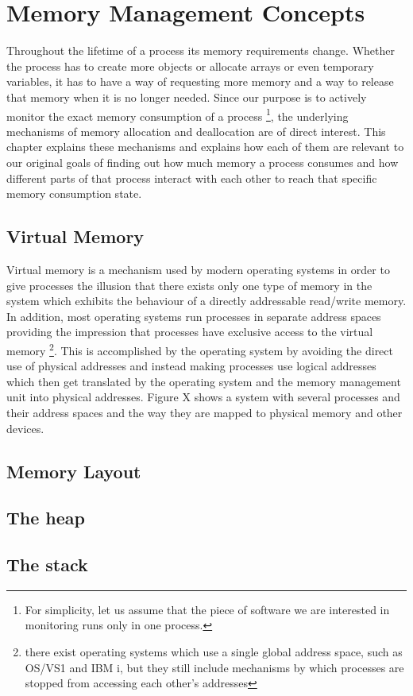 \chapter{Memory Management Concepts}
\label{chapter:memmgmt}

Throughout the lifetime of a process its memory requirements change. Whether the process has to create more objects or allocate arrays or even temporary variables, it has to have a way of requesting more memory and a way to release that memory when it is no longer needed. Since our purpose is to actively monitor the exact memory consumption of a process \footnote{For simplicity, let us assume that the piece of software we are interested in monitoring runs only in one process.}, the underlying mechanisms of memory allocation and deallocation are of direct interest.  This chapter explains these mechanisms and explains how each of them are relevant to our original goals of finding out how much memory a process consumes and how different parts of that process interact with each other to reach that specific memory consumption state.

\newpage

\section{Virtual Memory}
\label{section:virtmem}

Virtual memory is a mechanism used by modern operating systems in order to give processes the illusion that there exists only one type of memory in the system which exhibits the behaviour of a directly addressable read/write memory. In addition, most operating systems run processes in separate address spaces providing the impression that processes have exclusive access to the virtual memory \footnote{there exist operating systems which use a single global address space, such as OS/VS1 and IBM i, but they still include mechanisms by which processes are stopped from accessing each other's addresses}. This is accomplished by the operating system by avoiding the direct use of physical addresses and instead making processes use logical addresses which then get translated by the operating system and the memory management unit into physical addresses. Figure X shows a system with several processes and their address spaces and the way they are mapped to physical memory and other devices.

\section{Memory Layout}
\label{section:memlayout}

\section{The heap}
\label{section:heap}

\section{The stack}
\label{section:stack}
